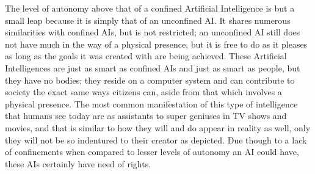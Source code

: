 The level of autonomy above that of a confined Artificial Intelligence is but a small leap because it is simply that of an unconfined AI. It shares numerous similarities with confined AIs, but is not restricted; an unconfined AI still does not have much in the way of a physical presence, but it is free to do as it pleases as long as the goals it was created with are being achieved. These Artificial Intelligences are just as smart as confined AIs and just as smart as people, but they have no bodies; they reside on a computer system and can contribute to society the exact same ways citizens can, aside from that which involves a physical presence. The most common manifestation of this type of intelligence that humans see today are as assistants to super geniuses in TV shows and movies, and that is similar to how they will and do appear in reality as well, only they will not be so indentured to their creator as depicted. Due though to a lack of confinements when compared to lesser levels of autonomy an AI could have, these AIs certainly have need of rights.
